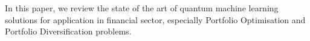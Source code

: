 
In this paper, we review the state of the art of quantum machine learning solutions for application in financial sector, especially Portfolio Optimisation and Portfolio Diversification problems.

